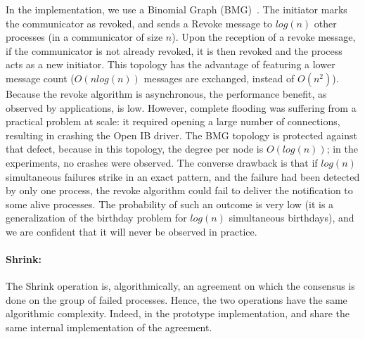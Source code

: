 %

In the \ulfm implementation, we use a Binomial Graph
(BMG)~\cite{Angskun07binomialgraph}. The initiator marks the
communicator as revoked, and sends a Revoke message to $log(n)$ other
processes (in a communicator of size $n$). Upon the reception of a
revoke message, if the communicator is not already revoked, it is then
revoked and the process acts as a new initiator. This topology has the
advantage of featuring a lower message count ($O(n log(n))$ messages are
exchanged, instead of $O(n^2)$). Because the revoke algorithm is
asynchronous, the performance benefit, as observed by applications, is
low. However, complete flooding was suffering from a practical problem
at scale: it required opening a large number of connections, resulting
in crashing the Open IB driver. The BMG topology is protected against
that defect, because in this topology, the degree per node is
$O(log(n))$; in the experiments, no crashes were observed. The converse
drawback is that if $log(n)$ simultaneous failures strike in an exact
pattern, and the failure had been detected by only one process, the
revoke algorithm could fail to deliver the notification to some alive
processes. The probability of such an outcome is very low (it is a
generalization of the birthday problem for $log(n)$ simultaneous
birthdays), and we are confident that it will never be observed in
practice. 


\paragraph*{Shrink:} The Shrink operation is, algorithmically, an agreement on
which the consensus is done on the group of failed processes.
Hence, the two operations have the same algorithmic complexity. Indeed, in the
prototype implementation,  and
 share the same internal implementation of the
agreement.
